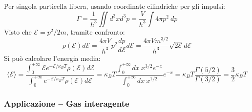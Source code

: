 \documentclass[10pt, a4paper]{scrartcl}
\numberwithin{equation}{subsection}
\theoremstyle{style1}
\begin{document}
Per singola particella libera, usando coordinate cilindriche per gli impulsi:
\begin{equation}
	\Gamma = \frac{1}{h^3} \iint d^3 x d^3 p = \frac{V}{h^3} \int 4\pi  p^2 \ dp
\end{equation}
Visto che $\mathscr{E} = p^2 / 2m$, tramite confronto:
\begin{equation}
	\rho (\mathscr{E})d \mathscr{E} = \frac{4\pi V }{h^3}p^2 \frac{d p}{d \mathscr{E}} d \mathscr{E}= \frac{4\pi V m^{3 / 2} }{h^3}\sqrt{2 \mathscr{E}} d \mathscr{E}
\end{equation}
Si pu\`o calcolare l'energia media:
\begin{equation*}
		\langle \mathscr{E} \rangle = \frac{\displaystyle \int_{0} ^{+\infty} \mathscr{E} e^{ - \mathscr{E} / \kappa _B T}  \rho (\mathscr{E}) d \mathscr{E}  }{\displaystyle \int_{0} ^{+\infty} e^{ - \mathscr{E} / \kappa _B T}  \rho (\mathscr{E}) d \mathscr{E}  }= \kappa _B T \frac{\displaystyle \int_{0} ^{+\infty} dx \ x^{3 / 2} e^{ - x} }{\displaystyle \int_{0} ^{+\infty}dx \ x^{1 / 2} } e ^{-x} = \kappa_B T \frac{\Gamma(5 / 2)}{\Gamma (3/2)} = \frac{3}{2} \kappa _B T
\end{equation*}
\subsubsection{Applicazione -- Gas interagente}
\end{document}
